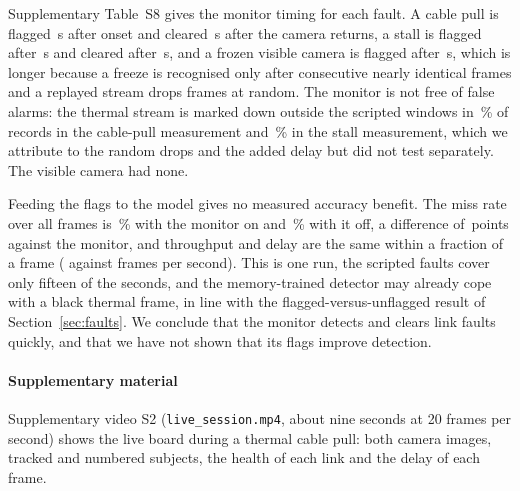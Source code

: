 Supplementary Table~S8 gives the monitor timing for each fault. A cable pull is flagged \livFaultOnUnpluggedDetectS{}\,s after onset and cleared \livFaultOnUnpluggedRecoverS{}\,s after the camera returns, a stall is flagged after \livFaultOnStalledDetectS{}\,s and cleared after \livFaultOnStalledRecoverS{}\,s, and a frozen visible camera is flagged after \livFaultOnFrozenDetectS{}\,s, which is longer because a freeze is recognised only after consecutive nearly identical frames and a replayed stream drops frames at random. The monitor is not free of false alarms: the thermal stream is marked down outside the scripted windows in \livFaultOnUnpluggedFalseAlarmPercent{}\,\% of records in the cable-pull measurement and \livFaultOnStalledFalseAlarmPercent{}\,\% in the stall measurement, which we attribute to the random drops and the added delay but did not test separately. The visible camera had none.

Feeding the flags to the model gives no measured accuracy benefit. The miss rate over all frames is \livFaultOnMr{}\,\% with the monitor on and \livFaultOffMr{}\,\% with it off, a difference of \livFaultMrChange{}\,points against the monitor, and throughput and delay are the same within a fraction of a frame (\livFaultOnFps{} against \livFaultOffFps{} frames per second). This is one run, the scripted faults cover only fifteen of the \cfgLinkSeconds{} seconds, and the memory-trained detector may already cope with a black thermal frame, in line with the flagged-versus-unflagged result of Section~\ref{sec:faults}. We conclude that the monitor detects and clears link faults quickly, and that we have not shown that its flags improve detection.

\paragraph{Supplementary material}
Supplementary video S2 (\texttt{live\_session.mp4}, about nine seconds at 20 frames per second) shows the live board during a thermal cable pull: both camera images, tracked and numbered subjects, the health of each link and the delay of each frame.
